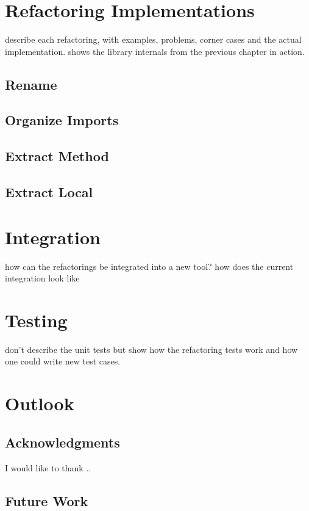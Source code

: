\documentclass[10pt,a4paper,oneside]{scrreprt}
\begin{document}
\chapter{Refactoring Implementations}

describe each refactoring, with examples, problems, corner cases and the actual implementation. shows the library internals from the previous chapter in action.

\section{Rename}
\section{Organize Imports}
\section{Extract Method}
\section{Extract Local}


\chapter{Integration}

how can the refactorings be integrated into a new tool?
how does the current integration look like

\chapter{Testing}

don't describe the unit tests but show how the refactoring tests work and how one could write new test cases.

\chapter{Outlook}

\section{Acknowledgments}

I would like to thank ..

\section{Future Work}
\end{document}
